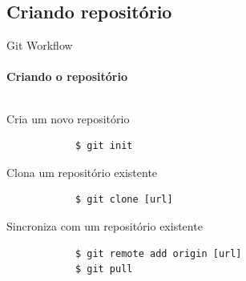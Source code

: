 \documentclass[xcolor=dvipsnames,t]{beamer}
\begin{document}
\subsection{Criando repositório}
\begin{frame}[fragile]{Git Workflow}
\framesubtitle{Criando o repositório}

\begin{columns}[t]
	
	\begin{column}{.7\textwidth}
		\vspace{0.1 cm}
		\begin{block}{Cria um novo repositório}		
			\begin{verbatim}
			$ git init
			\end{verbatim}
		\end{block}		
		\vspace{0.5 cm}
		\begin{alertblock}{Clona um repositório existente}		
			\begin{verbatim}
			$ git clone [url]
			\end{verbatim}
		\end{alertblock}
		\vspace{0.4 cm}
		\begin{alertblock}{Sincroniza com um repositório existente}		
			\begin{verbatim}
			$ git remote add origin [url]
			$ git pull 
			\end{verbatim}
		\end{alertblock}
		
	\end{column}


\end{columns}
\end{frame}
\end{document}
